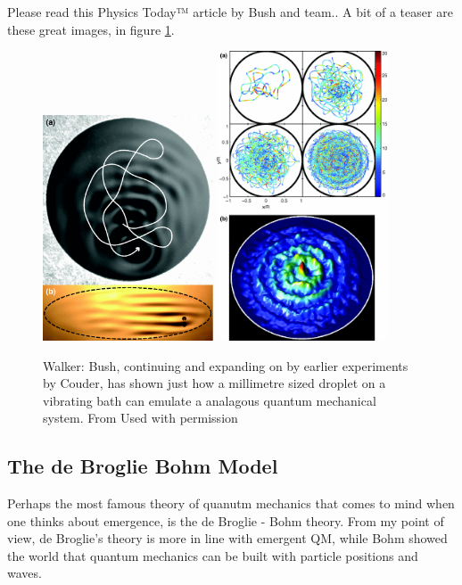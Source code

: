 \documentclass[../rzero]{subfiles}
\begin{document}
Please read this Physics Today™ article by Bush and team.\cite{Bush2015a}. A bit of a teaser are these great images, in figure \ref{bushWalkerFigure}.
\begin{figure}\label{bushWalkerFigure}
\includegraphics[width=0.45\textwidth]{chapters/images/bush-drop-path.png}
\includegraphics[width=0.45\textwidth]{chapters/images/bush-corral.png}
\caption{Walker: Bush, continuing and expanding on by earlier experiments by Couder, has shown just how a millimetre sized droplet on a vibrating bath can emulate a analagous quantum mechanical system. From\cite{harrisWavelikeStatisticsPilotwave2013} Used with permission}
\end{figure}

\subsection{The de Broglie Bohm Model}
Perhaps the most famous theory of quanutm mechanics that comes to mind when one thinks about emergence, is the de Broglie - Bohm theory. From my point of view, de Broglie's theory is more in line with emergent QM, while Bohm showed the world that quantum mechanics can be built with particle positions and waves. 
\end{document}
